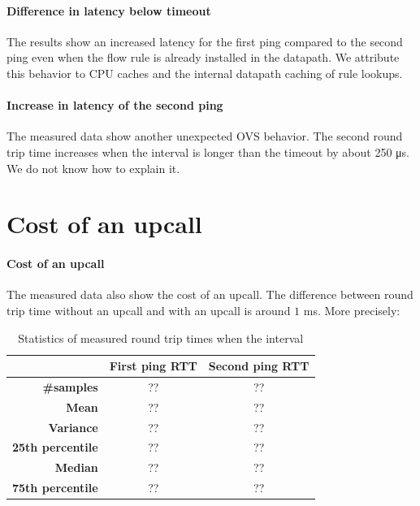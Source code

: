 \paragraph{Difference in latency below timeout}
The results show an increased latency for the first ping compared to the second ping even when the flow rule is already installed in the datapath. We attribute this behavior to CPU caches and the internal datapath caching of rule lookups. 


\paragraph{Increase in latency of the second ping} The measured data show another unexpected OVS behavior. The second round trip time increases when the interval is longer than the timeout by about 250 \si{\micro\second}. We do not know how to explain it.


\section{Cost of an upcall}
\label{res:upcall-cost}

\paragraph{Cost of an upcall}
The measured data also show the cost of an upcall. The difference between round trip time without an upcall and with an upcall is around $1$ \si{\milli\second}. More precisely:

\begin{table}[h!]
    \begin{center}
        \caption{Statistics of measured round trip times when the interval }
        \label{tab:upcall-cost}
        \begin{tabular}{r|cc}
            & \textbf{First ping RTT} & \textbf{Second ping RTT} \\
            \hline
            \textbf{\#samples} & ?? & ?? \\
            \textbf{Mean} & ?? & ??\\
            \textbf{Variance} & ?? & ?? \\
            \textbf{25th percentile} & ?? & ??  \\
            \textbf{Median} & ?? & ??\\
            \textbf{75th percentile} & ?? & ?? \\
        \end{tabular}
    \end{center}
\end{table}

